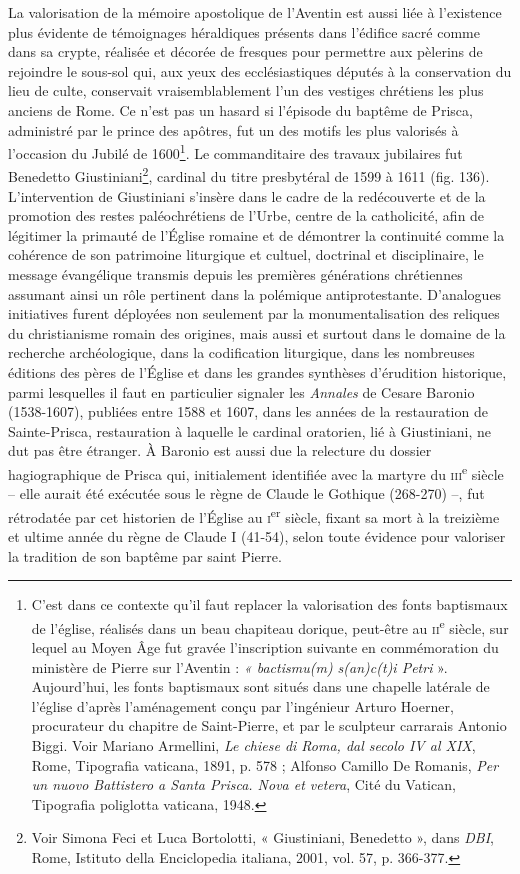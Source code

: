 \documentclass[12pt,twoside,openany]{book}
\begin{document}
La valorisation de la mémoire apostolique de l’Aventin est aussi liée à l’existence plus évidente de témoignages héraldiques présents dans l’édifice sacré comme dans sa crypte, réalisée et décorée de fresques pour permettre aux pèlerins de rejoindre le sous-sol qui, aux yeux des ecclésiastiques députés à la conservation du lieu de culte, conservait vraisemblablement l’un des vestiges chrétiens les plus anciens de Rome. Ce n’est pas un hasard si l’épisode du baptême de Prisca, administré par le prince des apôtres, fut un des motifs les plus valorisés à l’occasion du Jubilé de 1600\footnote{C’est dans ce contexte qu’il faut replacer la valorisation des fonts baptismaux de l’église, réalisés dans un beau chapiteau dorique, peut-être au \textsc{ii}\textsuperscript{e} siècle, sur lequel au Moyen Âge fut gravée l’inscription suivante en commémoration du ministère de Pierre sur l’Aventin : \textit{« bactismu(m) s(an)c(t)i Petri} ». Aujourd’hui, les fonts baptismaux sont situés dans une chapelle latérale de l’église d’après l’aménagement conçu par l’ingénieur Arturo Hoerner, procurateur du chapitre de Saint-Pierre, et par le sculpteur carrarais Antonio Biggi. Voir Mariano Armellini, \textit{Le chiese di Roma, dal secolo IV al XIX}, Rome, Tipografia vaticana, 1891, p. 578 ; Alfonso Camillo De Romanis, \textit{Per un nuovo Battistero a Santa Prisca. Nova et vetera}, Cité du Vatican, Tipografia poliglotta vaticana, 1948.}. Le commanditaire des travaux jubilaires fut Benedetto Giustiniani\footnote{Voir Simona Feci et Luca Bortolotti, « Giustiniani, Benedetto », dans \textit{DBI}, Rome, Istituto della Enciclopedia italiana, 2001, vol. 57, p. 366-377.}, cardinal du titre presbytéral de 1599 à 1611 (fig. 136). L’intervention de Giustiniani s’insère dans le cadre de la redécouverte et de la promotion des restes paléochrétiens de l’Urbe, centre de la catholicité, afin de légitimer la primauté de l’Église romaine et de démontrer la continuité comme la cohérence de son patrimoine liturgique et cultuel, doctrinal et disciplinaire, le message évangélique transmis depuis les premières générations chrétiennes assumant ainsi un rôle pertinent dans la polémique antiprotestante. D’analogues initiatives furent déployées non seulement par la monumentalisation des reliques du christianisme romain des origines, mais aussi et surtout dans le domaine de la recherche archéologique, dans la codification liturgique, dans les nombreuses éditions des pères de l’Église et dans les grandes synthèses d’érudition historique, parmi lesquelles il faut en particulier signaler les \textit{Annales} de Cesare Baronio (1538-1607), publiées entre 1588 et 1607, dans les années de la restauration de Sainte-Prisca, restauration à laquelle le cardinal oratorien, lié à Giustiniani, ne dut pas être étranger. À Baronio est aussi due la relecture du dossier hagiographique de Prisca qui, initialement identifiée avec la martyre du \textsc{iii}\textsuperscript{e} siècle – elle aurait été exécutée sous le règne de Claude le Gothique (268-270) –, fut rétrodatée par cet historien de l’Église au \textsc{i}\textsuperscript{er} siècle, fixant sa mort à la treizième et ultime année du règne de Claude I (41-54), selon toute évidence pour valoriser la tradition de son baptême par saint Pierre.
\end{document}
